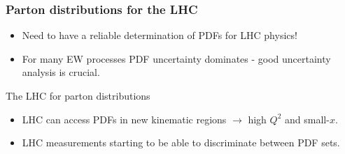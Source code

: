 \documentclass[10pt]{beamer}
\begin{document}
\begin{frame}
\frametitle{Parton distributions for the LHC}
\vskip-10pt
\vskip-10pt
\vskip-10pt

\begin{itemize}
		\item<1-> Need to have a reliable determination of PDFs for LHC physics!
		\item<1-> For many EW processes PDF uncertainty dominates - good uncertainty analysis is crucial.
\end{itemize}
\vskip30pt
{   \color{lavendar} The LHC for parton distributions }
\vskip20pt

\begin{itemize}
		\item<1-> LHC can access PDFs in new kinematic regions $\to$ high $Q^2$ and small-$x$.
		\item<1-> LHC measurements starting to be able to discriminate between PDF sets.
\end{itemize}
	
\end{frame}
\end{document}
